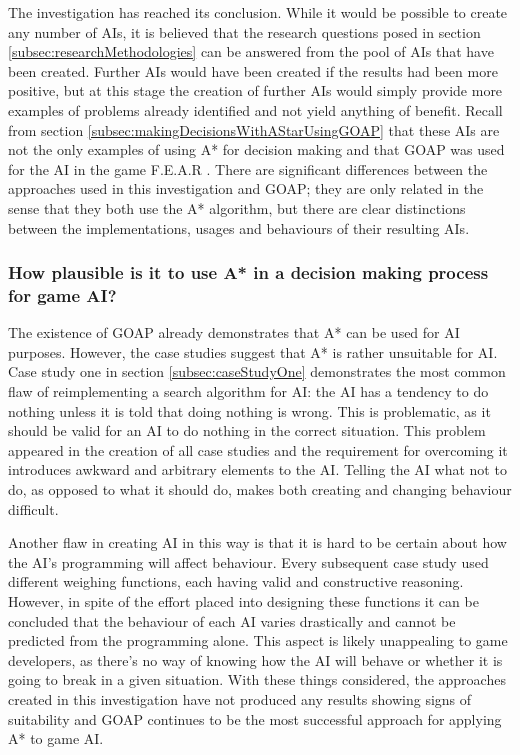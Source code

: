 \documentclass[11pt, a4paper]{report}
\begin{document}
The investigation has reached its conclusion. While it would be possible to create any number of AIs, it is believed that the research questions posed in section \ref{subsec:researchMethodologies} can be answered from the pool of AIs that have been created. Further AIs would have been created if the results had been more positive, but at this stage the creation of further AIs would simply provide more examples of problems already identified and not yield anything of benefit. Recall from section \ref{subsec:makingDecisionsWithAStarUsingGOAP} that these AIs are not the only examples of using A* for decision making and that GOAP \parencite{orkin2003applying} was used for the AI in the game F.E.A.R \parencite{FEAR}. There are significant differences between the approaches used in this investigation and GOAP; they are only related in the sense that they both use the A* algorithm, but there are clear distinctions between the implementations, usages and behaviours of their resulting AIs.

\subsubsection{How plausible is it to use A* in a decision making process for game AI?}

The existence of GOAP already demonstrates that A* can be used for AI purposes. However, the case studies suggest that A* is rather unsuitable for AI. Case study one in section \ref{subsec:caseStudyOne} demonstrates the most common flaw of reimplementing a search algorithm for AI: the AI has a tendency to do nothing unless it is told that doing nothing is wrong. This is problematic, as it should be valid for an AI to do nothing in the correct situation. This problem appeared in the creation of all case studies and the requirement for overcoming it introduces awkward and arbitrary elements to the AI. Telling the AI what not to do, as opposed to what it should do, makes both creating and changing behaviour difficult.

Another flaw in creating AI in this way is that it is hard to be certain about how the AI's programming will affect behaviour. Every subsequent case study used different weighing functions, each having valid and constructive reasoning. However, in spite of the effort placed into designing these functions it can be concluded that the behaviour of each AI varies drastically and cannot be predicted from the programming alone. This aspect is likely unappealing to game developers, as there's no way of knowing how the AI will behave or whether it is going to break in a given situation. With these things considered, the approaches created in this investigation have not produced any results showing signs of suitability and GOAP continues to be the most successful approach for applying A* to game AI. 
\end{document}
